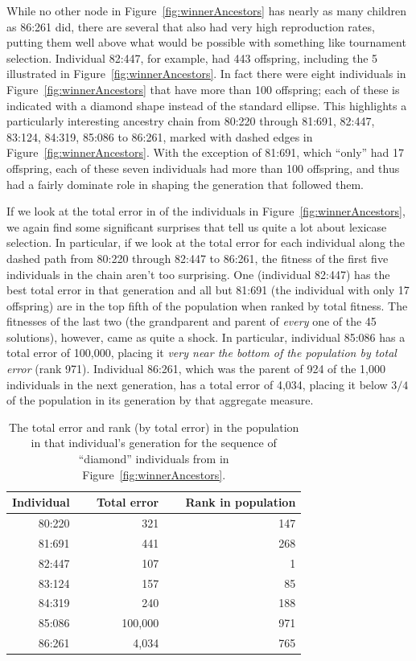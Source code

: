 While no other node in Figure~\ref{fig:winnerAncestors} has nearly as many children as 86:261 did,
there are several that also had very high reproduction rates, putting them well above what would be 
possible with something like tournament selection. Individual 82:447, for example, had
443 offspring, including the 5 illustrated in Figure~\ref{fig:winnerAncestors}. In fact there were
eight individuals in Figure~\ref{fig:winnerAncestors} that have more than 100 offspring; each of
these is indicated with a diamond shape instead of the standard ellipse. This highlights a particularly
interesting ancestry chain from 80:220 through 81:691, 82:447, 83:124, 84:319, 85:086 to 86:261, marked with
dashed edges in Figure~\ref{fig:winnerAncestors}. With the exception of 81:691, which ``only'' had 17
offspring, each of these seven individuals had more
than 100 offspring, and thus had a fairly dominate role in shaping the generation that followed them. 

If we look at the total error in of the individuals in Figure~\ref{fig:winnerAncestors}, we again
find some significant surprises that tell us quite a lot about lexicase selection. In particular, if
we look at the total error for each individual along the dashed path from 80:220 through
82:447 to 86:261, the fitness of the first five
individuals in the chain aren't too surprising. One (individual 82:447) has the best total error in
that generation and all but 81:691 (the individual with only 17 offspring) are in the top fifth of the 
population when ranked by total fitness. The fitnesses 
of the last two (the grandparent and parent of \emph{every} one of the 45 solutions), however, 
came as quite a shock. In particular, individual 85:086 has a total error of 100,000, placing it
\emph{very near the bottom of the population by total error} (rank 971). Individual 86:261, which was
the parent of 924 of the 1,000 individuals in the next generation, has a total error of 4,034, placing
it below $3/4$ of the population in its generation by that aggregate measure.

\begin{table}[t]
	\caption{The total error and rank (by total error) in the population in that individual's generation
		for the sequence of ``diamond'' individuals from in Figure~\ref{fig:winnerAncestors}.}
	\label{table:winnerFitnesses}
	\begin{center}
	\begin{tabular}{rrr}
		Individual & $\quad$ Total error & $\quad$ Rank in population \\
		\hline\noalign{\smallskip}
		80:220 & 321 & 147 \\
		81:691 & 441 & 268 \\
		82:447 & 107 & 1 \\
		83:124 & 157 & 85 \\
		84:319 & 240 & 188 \\
		85:086 & 100,000 & 971 \\
		86:261 & 4,034 & 765
	\end{tabular}
	\end{center}
\end{table}

